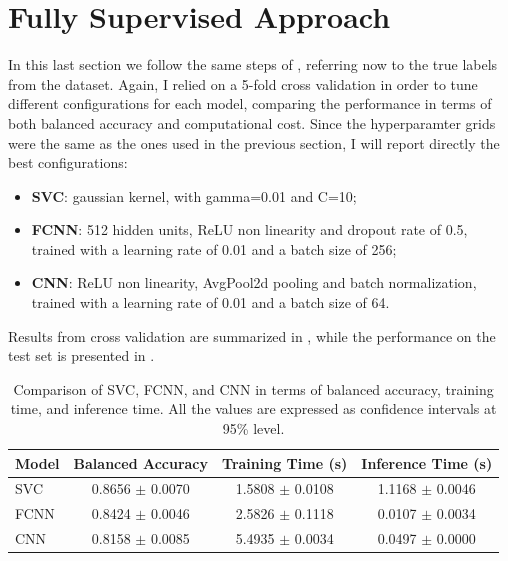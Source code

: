 \section{Fully Supervised Approach}\label{fully_supervised_approach}
In this last section we follow the same steps of , referring now
to the true labels from the dataset. Again, I relied on a 5-fold cross validation in order to tune different configurations for each model,
comparing the performance in terms of both balanced accuracy and computational cost. Since the hyperparamter grids were the same as the 
ones used in the previous section, I will report directly the best configurations:
\begin{itemize}
    \item \textbf{SVC}: gaussian kernel, with gamma=0.01 and C=10;
    \item \textbf{FCNN}: 512 hidden units, ReLU non linearity and dropout rate of 0.5, trained with 
    a learning rate of 0.01 and a batch size of 256;
    \item \textbf{CNN}:  ReLU non linearity, AvgPool2d pooling and batch normalization, trained with
    a learning rate of 0.01 and a batch size of 64.
\end{itemize}
Results from cross validation are summarized in , 
while the performance on the test set is presented in .

\begin{table}[h!]
    \centering
    \begin{adjustbox}{max width=0.85\textwidth}
    \begin{tabular}{|l|c|c|c|}
    \hline
    \textbf{Model} & \textbf{Balanced Accuracy} & \textbf{Training Time (s)} & \textbf{Inference Time (s)}  \\
    \hline
    SVC & 0.8656  $\pm$ 0.0070 & 1.5808 $\pm$ 0.0108 & 1.1168 $\pm$ 0.0046 \\
    FCNN & 0.8424 $\pm$ 0.0046 & 2.5826 $\pm$ 0.1118 & 0.0107 $\pm$ 0.0034 \\
    CNN & 0.8158  $\pm$ 0.0085 & 5.4935 $\pm$ 0.0034 & 0.0497 $\pm$ 0.0000 \\
    \hline
    \end{tabular}
    \end{adjustbox}
    \caption{\footnotesize Comparison of SVC, FCNN, and CNN in terms of balanced accuracy, training time, and inference time. 
    All the values are expressed as confidence intervals at 95\% level.}
    \label{tab:model_comparison_FullySupervised}
\end{table}

